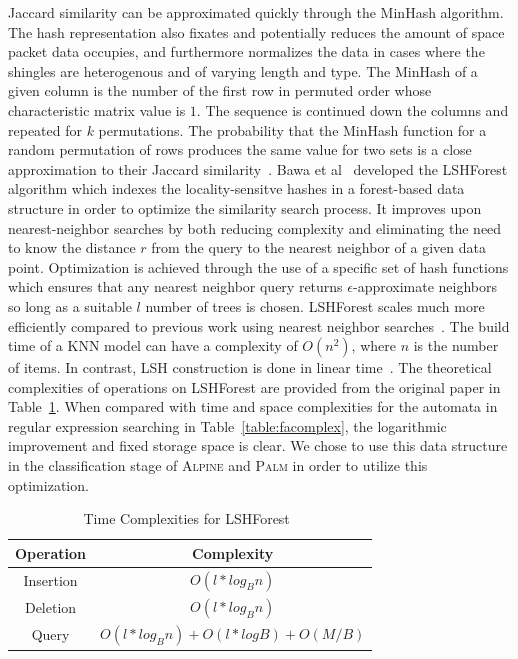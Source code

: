 Jaccard similarity can be approximated quickly through the MinHash algorithm. The hash representation also fixates and potentially reduces the amount of space packet data occupies, and furthermore normalizes the data in cases where the shingles are heterogenous and of varying length and type. The MinHash of a given column is the number of the first row in permuted order whose characteristic matrix value is $1$. The sequence is continued down the columns and repeated for $k$ permutations. The probability that the MinHash function for a random permutation of rows produces the same value for two sets is a close approximation to their Jaccard similarity~\cite{mmds}. Bawa et al~\cite{lshforest} developed the LSHForest algorithm which indexes the locality-sensitve hashes in a forest-based data structure in order to optimize the similarity search process. It improves upon nearest-neighbor searches by both reducing complexity and eliminating the need to know the distance $r$ from the query to the nearest neighbor of a given data point. Optimization is achieved through the use of a specific set of hash functions which ensures that any nearest neighbor query returns $\epsilon$-approximate neighbors so long as a suitable $l$ number of trees is chosen. LSHForest scales much more efficiently compared to previous work using nearest neighbor searches~\cite{fpga}. The build time of a KNN model can have a complexity of $O(n^2)$, where $n$ is the number of items. In contrast, LSH construction is done in linear time~\cite{lshforest}. The theoretical complexities of operations on LSHForest are provided from the original paper in Table~\ref{table:forestcomplex}. When compared with time and space complexities for the automata in regular expression searching in Table~\ref{table:facomplex}, the logarithmic improvement and fixed storage space is clear. We chose to use this data structure in the classification stage of \textsc{Alpine} and \textsc{Palm} in order to utilize this optimization.

\begin{table} [ht!]
\caption{Time Complexities for LSHForest~\cite{lshforest}}
\centering
\begin{tabular}{|c | c |}
\hline
\textbf{Operation} & \textbf{Complexity} \\
\hline
Insertion & $O(l * log_B n)$ \\
\hline
Deletion & $O(l * log_B n)$ \\
\hline
Query &  $O(l * log_B n) + O(l * log B) + O(M/B)$\\
\hline
\end{tabular}
\label{table:forestcomplex}
\end{table}

